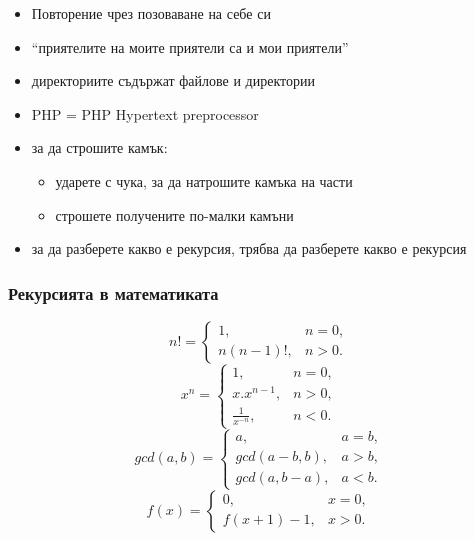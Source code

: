\documentclass{beamer}
\begin{document}
\begin{frame}
\begin{center}
{{      }}
  \end{center}
  \begin{itemize}[<+(3)->]
  \item Повторение чрез позоваване на себе си
  \item ``приятелите на моите приятели са и мои приятели''
  \item директориите съдържат файлове и директории
  \item PHP = PHP Hypertext preprocessor
  \item за да строшите камък:
    \begin{itemize}
    \item ударете с чука, за да натрошите камъка на части
    \item строшете получените по-малки камъни
    \end{itemize}
  \item за да разберете какво е рекурсия, трябва да разберете какво е рекурсия
  \end{itemize}
\end{frame}

\begin{frame}
  \frametitle{Рекурсията в математиката}

  \begin{equation*}
    n! =
    \begin{cases}
      1,& n = 0,\\
      n(n-1)!,&n > 0.
    \end{cases}
  \end{equation*}
  \pause
  \begin{equation*}
    x^n =
    \begin{cases}
      1,&n = 0,\\
      x.x^{n-1},&n > 0,\\
      \frac1{x^{-n}},&n<0.
    \end{cases}
  \end{equation*}
  \pause
  \begin{equation*}
    gcd(a,b)=
    \begin{cases}
      a,&a = b,\\
      gcd(a-b,b),&a>b,\\
      gcd(a,b-a),&a<b.
    \end{cases}
  \end{equation*}
  \pause
  \begin{equation*}
    f(x)=
    \begin{cases}
      0,&x = 0,\\
      f(x+1)-1,&x>0.
    \end{cases}
  \end{equation*}
\end{frame}
\end{document}
